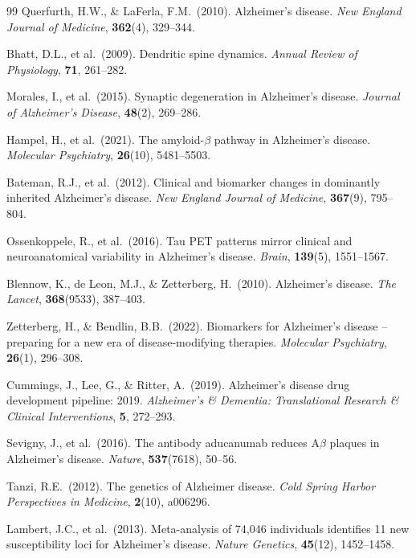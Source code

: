 ﻿\documentclass[12pt,a4paper]{article}
\theoremstyle{definition}
\begin{document}
\begin{thebibliography}{99}
		Querfurth, H.W., \& LaFerla, F.M.\ (2010). Alzheimer's disease. \textit{New England Journal of Medicine}, \textbf{362}(4), 329--344.

		Bhatt, D.L., et al.\ (2009). Dendritic spine dynamics. \textit{Annual Review of Physiology}, \textbf{71}, 261--282.

		Morales, I., et al.\ (2015). Synaptic degeneration in Alzheimer's disease. \textit{Journal of Alzheimer's Disease}, \textbf{48}(2), 269--286.

		Hampel, H., et al.\ (2021). The amyloid-$\beta$ pathway in Alzheimer's disease. \textit{Molecular Psychiatry}, \textbf{26}(10), 5481--5503.

		Bateman, R.J., et al.\ (2012). Clinical and biomarker changes in dominantly inherited Alzheimer's disease. \textit{New England Journal of Medicine}, \textbf{367}(9), 795--804.

		Ossenkoppele, R., et al.\ (2016). Tau PET patterns mirror clinical and neuroanatomical variability in Alzheimer's disease. \textit{Brain}, \textbf{139}(5), 1551--1567.

		Blennow, K., de Leon, M.J., \& Zetterberg, H.\ (2010). Alzheimer's disease. \textit{The Lancet}, \textbf{368}(9533), 387--403.

		Zetterberg, H., \& Bendlin, B.B.\ (2022). Biomarkers for Alzheimer's disease -- preparing for a new era of disease-modifying therapies. \textit{Molecular Psychiatry}, \textbf{26}(1), 296--308.

		Cummings, J., Lee, G., \& Ritter, A.\ (2019). Alzheimer's disease drug development pipeline: 2019. \textit{Alzheimer's \& Dementia: Translational Research \& Clinical Interventions}, \textbf{5}, 272--293.

		Sevigny, J., et al.\ (2016). The antibody aducanumab reduces A$\beta$ plaques in Alzheimer's disease. \textit{Nature}, \textbf{537}(7618), 50--56.

		Tanzi, R.E.\ (2012). The genetics of Alzheimer disease. \textit{Cold Spring Harbor Perspectives in Medicine}, \textbf{2}(10), a006296.

		Lambert, J.C., et al.\ (2013). Meta-analysis of 74,046 individuals identifies 11 new susceptibility loci for Alzheimer's disease. \textit{Nature Genetics}, \textbf{45}(12), 1452--1458.


\end{thebibliography}
\end{document}
